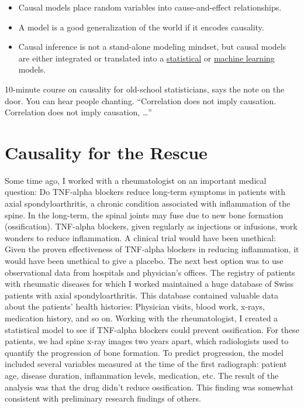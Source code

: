 \documentclass[
  10pt,
]{scrbook}
\providecommand{\tightlist}{%
  \setlength{\itemsep}{0pt}\setlength{\parskip}{0pt}}
\begin{document}
\begin{itemize}
\tightlist
\item
  Causal models place random variables into cause-and-effect relationships.
\item
  A model is a good generalization of the world if it encodes causality.
\item
  Causal inference is not a stand-alone modeling mindset, but causal models are either integrated or translated into a \protect\hyperlink{statistical-modeling}{statistical} or \protect\hyperlink{machine-learning}{machine learning} models.
\end{itemize}

10-minute course on causality for old-school statisticians, says the note on the door.
You can hear people chanting.
``Correlation does not imply causation. Correlation does not imply causation, \ldots{}''

\hypertarget{causality-for-the-rescue}{%
\section{Causality for the Rescue}\label{causality-for-the-rescue}}

Some time ago, I worked with a rheumatologist on an important medical question:
Do TNF-alpha blockers reduce long-term symptoms in patients with axial spondyloarthritis, a chronic condition associated with inflammation of the spine.
In the long-term, the spinal joints may fuse due to new bone formation (ossification).
TNF-alpha blockers, given regularly as injections or infusions, work wonders to reduce inflammation.
A clinical trial would have been unethical:
Given the proven effectiveness of TNF-alpha blockers in reducing inflammation, it would have been unethical to give a placebo.
The next best option was to use observational data from hospitals and physician's offices.
The registry of patients with rheumatic diseases for which I worked maintained a huge database of Swiss patients with axial spondyloarthritis.
This database contained valuable data about the patients' health histories:
Physician visits, blood work, x-rays, medication history, and so on.
Working with the rheumatologist, I created a statistical model to see if TNF-alpha blockers could prevent ossification.
For these patients, we had spine x-ray images two years apart, which radiologists used to quantify the progression of bone formation.
To predict progression, the model included several variables measured at the time of the first radiograph: patient age, disease duration, inflammation levels, medication, etc.
The result of the analysis was that the drug didn't reduce ossification.
This finding was somewhat consistent with preliminary research findings of others.
\end{document}
